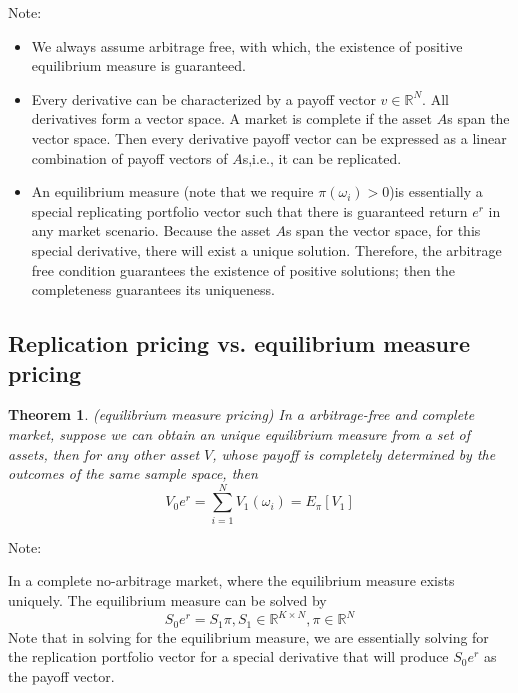 \documentclass[a4paper,13pt]{report}
\newcommand{\R}{\mathbb{R}}
\newtheorem{theorem}{Theorem}[section]
\begin{document}
Note: 
\begin{itemize}
    \item We always assume arbitrage free, with which, the existence of positive equilibrium measure is guaranteed. 
    \item Every derivative can be characterized by a payoff vector $v\in \R^N$. All derivatives form a vector space. A market is complete if the asset $A$s span the vector space. Then every derivative payoff vector can be expressed as a linear combination of payoff vectors of $A$s,i.e., it can be replicated. 
    \item An equilibrium measure (note that we require $\pi(\omega_i) > 0$)is essentially a special replicating portfolio vector such that there is guaranteed return $e^r$ in any market scenario. Because the asset $A$s span the vector space, for this special derivative, there will exist a unique solution. Therefore, the arbitrage free condition guarantees the existence of positive solutions; then the completeness guarantees its uniqueness.
\end{itemize}






\subsection{Replication pricing vs. equilibrium measure pricing}


\begin{theorem}
(equilibrium measure pricing) In a arbitrage-free and complete market, suppose we can obtain an unique equilibrium measure from a set of assets, then for any other asset $V$, whose payoff is completely determined by the outcomes of the same sample space, then 
$$V_0 e^r= \sum_{i=1}^N V_1(\omega_i) = E_{\pi}[V_1]$$
\end{theorem}

Note:

In a complete no-arbitrage market, where the equilibrium measure exists uniquely. The equilibrium measure can be solved by $$S_0 e^r = S_1 \pi,S_1\in \R^{K\times N}, \pi \in \R^N$$
Note that in solving for the equilibrium measure, we are essentially solving for the replication portfolio vector for a special derivative that will produce $S_0 e^r$ as the payoff vector. 
\end{document}
